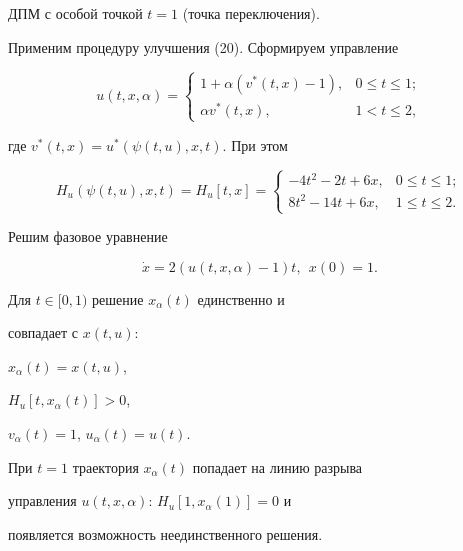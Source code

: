 ДПМ с особой точкой $t =1$ (точка переключения).





Применим процедуру улучшения (20). Сформируем управление


$$u(t, x, \alpha) =


\begin{cases}


1 + \alpha(v^{*}(t, x) - 1), & 0 \leq t \leq 1;\\


\alpha v^{*}(t, x), & 1 < t \leq 2,


\end{cases}


$$


где $v^{*}(t, x) = u^{*}(\psi(t, u), x, t).$ При этом


$$


H_{u}(\psi(t, u), x, t) = H_{u}[t, x] =


\begin{cases}


- 4t^{2} - 2t + 6x, & 0 \leq t \leq 1;\\


8t^{2} - 14t + 6x, & 1 \leq t \leq 2.


\end{cases}


$$


Решим фазовое уравнение


\begin{equation}


\Dot{x} = 2(u(t, x, \alpha) - 1)t,\ \ x(0) = 1.


\end{equation}


Для $t \in [0, 1)$ решение $x_{\alpha}(t)$ единственно и


совпадает с $x(t, u)$:


$x_{\alpha}(t) = x(t, u)$,


$H_{u}[t, x_{\alpha}(t)] > 0$,


$v_{\alpha}(t) = 1$, $u_{\alpha}(t) = u(t)$.





При $t = 1$ траектория $x_{\alpha}(t)$ попадает на линию разрыва


управления $u(t, x, \alpha)$: $H_{u}[1, x_{\alpha}(1)] = 0$ и


появляется возможность неединственного решения.





